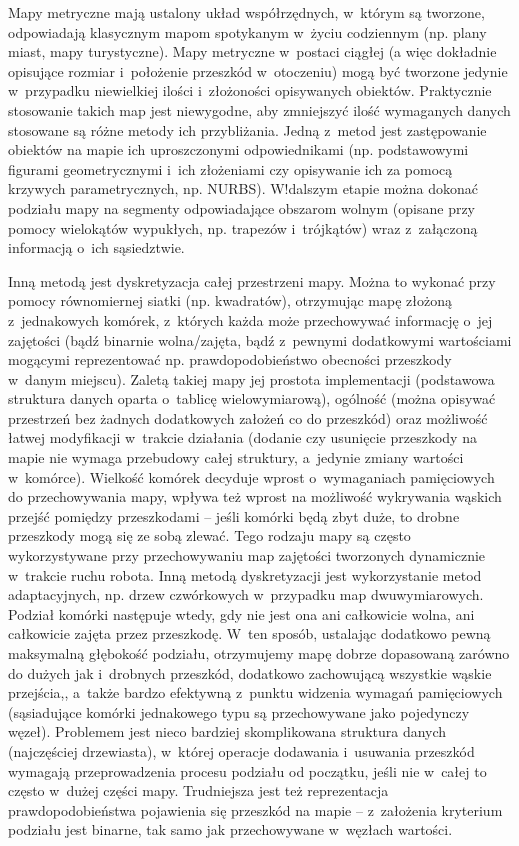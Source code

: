 Mapy metryczne mają ustalony układ współrzędnych, w~którym są tworzone, odpowiadają
klasycznym mapom spotykanym w~życiu codziennym (np. plany miast, mapy turystyczne).
Mapy metryczne w~postaci ciągłej (a więc dokładnie opisujące rozmiar i~położenie
przeszkód w~otoczeniu) mogą być tworzone jedynie w~przypadku niewielkiej ilości
i~złożoności opisywanych obiektów. Praktycznie stosowanie takich map jest niewygodne,
aby zmniejszyć ilość wymaganych danych stosowane są różne metody ich przybliżania.
Jedną z~metod jest zastępowanie obiektów na mapie ich uproszczonymi odpowiednikami
(np. podstawowymi figurami geometrycznymi i~ich złożeniami czy opisywanie ich za pomocą
krzywych parametrycznych, np. NURBS). W!dalszym etapie można dokonać podziału mapy
na segmenty odpowiadające obszarom wolnym (opisane przy pomocy wielokątów wypukłych,
np. trapezów i~trójkątów) wraz z~załączoną informacją o~ich sąsiedztwie.

Inną metodą jest dyskretyzacja całej przestrzeni mapy. Można to wykonać przy pomocy
równomiernej siatki (np. kwadratów), otrzymując mapę złożoną z~jednakowych komórek,
z~których każda może przechowywać informację o~jej zajętości (bądź binarnie wolna/zajęta,
bądź z~pewnymi dodatkowymi wartościami mogącymi reprezentować np. prawdopodobieństwo
obecności przeszkody w~danym miejscu). Zaletą takiej mapy jej prostota implementacji
(podstawowa struktura danych oparta o~tablicę wielowymiarową), ogólność (można opisywać
przestrzeń bez żadnych dodatkowych założeń co do przeszkód) oraz możliwość łatwej modyfikacji
w~trakcie działania (dodanie czy usunięcie przeszkody na mapie nie wymaga przebudowy
całej struktury, a~jedynie zmiany wartości w~komórce). Wielkość komórek decyduje wprost
o~wymaganiach pamięciowych do przechowywania mapy, wpływa też wprost na możliwość
wykrywania wąskich przejść pomiędzy przeszkodami -- jeśli komórki będą zbyt duże, to
drobne przeszkody mogą się ze sobą zlewać. Tego rodzaju mapy są często wykorzystywane
przy przechowywaniu map zajętości tworzonych dynamicznie w~trakcie ruchu robota.
Inną metodą dyskretyzacji jest wykorzystanie metod adaptacyjnych, np. drzew czwórkowych
w~przypadku map dwuwymiarowych. Podział komórki następuje wtedy, gdy nie jest ona
ani całkowicie wolna, ani całkowicie zajęta przez przeszkodę. W~ten sposób, ustalając
dodatkowo pewną maksymalną głębokość podziału, otrzymujemy mapę dobrze dopasowaną
zarówno do dużych jak i~drobnych przeszkód, dodatkowo zachowującą wszystkie wąskie
przejścia,, a~także bardzo efektywną z~punktu widzenia wymagań pamięciowych (sąsiadujące
komórki jednakowego typu są przechowywane jako pojedynczy węzeł). Problemem jest
nieco bardziej skomplikowana struktura danych (najczęściej drzewiasta), w~której
operacje dodawania i~usuwania przeszkód wymagają przeprowadzenia procesu podziału
od początku, jeśli nie w~całej to często w~dużej części mapy. Trudniejsza jest też
reprezentacja prawdopodobieństwa pojawienia się przeszkód na mapie -- z~założenia kryterium
podziału jest binarne, tak samo jak przechowywane w~węzłach wartości.

